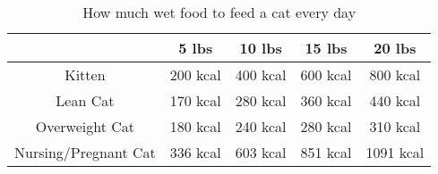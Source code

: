 \begin{table}[h!]
    \centering
    \begin{tabular}{|c | c c c c|} 
     \hline
         & 5 lbs & 10 lbs & 15 lbs & 20 lbs \\ [0.5ex] 
     \hline\hline
        Kitten & 200 kcal & 400 kcal & 600 kcal & 800 kcal \\ 
        Lean Cat & 170 kcal & 280 kcal & 360 kcal & 440 kcal \\
        Overweight Cat & 180 kcal & 240 kcal & 280 kcal & 310 kcal \\
        Nursing/Pregnant Cat & 336 kcal & 603 kcal & 851 kcal & 1091 kcal \\
    \hline
    \end{tabular}
    \caption{How much wet food to feed a cat every day}
    \label{table:food}
\end{table}